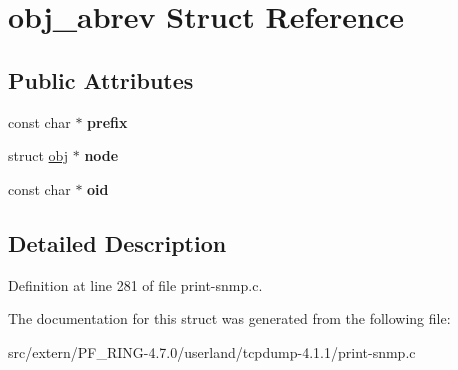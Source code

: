 \hypertarget{structobj__abrev}{
\section{obj\_\-abrev Struct Reference}
\label{structobj__abrev}
}
\subsection*{Public Attributes}
\begin{DoxyCompactItemize}
\item 
\hypertarget{structobj__abrev_aa586ddc144e213379d4fcdd866a39f3d}{
const char $\ast$ {\bfseries prefix}}
\label{structobj__abrev_aa586ddc144e213379d4fcdd866a39f3d}

\item 
\hypertarget{structobj__abrev_a54547835fc278fd35c51bc273834e662}{
struct \hyperlink{structobj}{obj} $\ast$ {\bfseries node}}
\label{structobj__abrev_a54547835fc278fd35c51bc273834e662}

\item 
\hypertarget{structobj__abrev_a4a8376acda6385b7644121a66e80d368}{
const char $\ast$ {\bfseries oid}}
\label{structobj__abrev_a4a8376acda6385b7644121a66e80d368}

\end{DoxyCompactItemize}


\subsection{Detailed Description}


Definition at line 281 of file print-\/snmp.c.



The documentation for this struct was generated from the following file:\begin{DoxyCompactItemize}
\item 
src/extern/PF\_\-RING-\/4.7.0/userland/tcpdump-\/4.1.1/print-\/snmp.c\end{DoxyCompactItemize}
